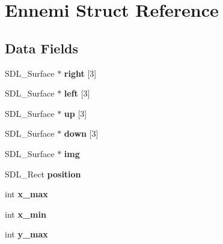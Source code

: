 \hypertarget{structEnnemi}{}\section{Ennemi Struct Reference}
\label{structEnnemi}
\subsection*{Data Fields}
\begin{DoxyCompactItemize}
\item 
S\+D\+L\+\_\+\+Surface $\ast$ {\bfseries right} \mbox{[}3\mbox{]}\hypertarget{structEnnemi_a53607d0deebfb02a58e537d109572347}{}\label{structEnnemi_a53607d0deebfb02a58e537d109572347}

\item 
S\+D\+L\+\_\+\+Surface $\ast$ {\bfseries left} \mbox{[}3\mbox{]}\hypertarget{structEnnemi_ac7eb465216da10870f3a6df7230ffb90}{}\label{structEnnemi_ac7eb465216da10870f3a6df7230ffb90}

\item 
S\+D\+L\+\_\+\+Surface $\ast$ {\bfseries up} \mbox{[}3\mbox{]}\hypertarget{structEnnemi_a6cbfc55f98a346312c72217b2fdf1638}{}\label{structEnnemi_a6cbfc55f98a346312c72217b2fdf1638}

\item 
S\+D\+L\+\_\+\+Surface $\ast$ {\bfseries down} \mbox{[}3\mbox{]}\hypertarget{structEnnemi_ac9e8f594fb46043ee35d7e3344f5233e}{}\label{structEnnemi_ac9e8f594fb46043ee35d7e3344f5233e}

\item 
S\+D\+L\+\_\+\+Surface $\ast$ {\bfseries img}\hypertarget{structEnnemi_a3a5352038138beaeffe4d80ff103bc2f}{}\label{structEnnemi_a3a5352038138beaeffe4d80ff103bc2f}

\item 
S\+D\+L\+\_\+\+Rect {\bfseries position}\hypertarget{structEnnemi_aa31d169528ee729764721ae9f258fcd7}{}\label{structEnnemi_aa31d169528ee729764721ae9f258fcd7}

\item 
int {\bfseries x\+\_\+max}\hypertarget{structEnnemi_a7f9ae34cddb90c5004dbbbbaded36633}{}\label{structEnnemi_a7f9ae34cddb90c5004dbbbbaded36633}

\item 
int {\bfseries x\+\_\+min}\hypertarget{structEnnemi_a6a5eac21aeaa2820f7517c59f5c909c7}{}\label{structEnnemi_a6a5eac21aeaa2820f7517c59f5c909c7}

\item 
int {\bfseries y\+\_\+max}\hypertarget{structEnnemi_a4ea31178b10ae7f71ce6c2918dac303b}{}\label{structEnnemi_a4ea31178b10ae7f71ce6c2918dac303b}


\end{DoxyCompactItemize}
